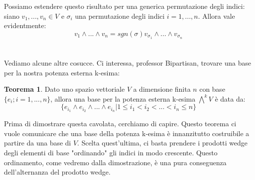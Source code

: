 \documentclass[12pt,a4paper]{report}
\theoremstyle{definition}
\theoremstyle{Theorem}
\newtheorem{Theo}[Def]{Teorema}
\theoremstyle{definition}
\theoremstyle{definition}
\theoremstyle{definition}
\begin{document}
	\\
	\\
	Possiamo estendere questo risultato per una generica permutazione degli indici: siano $v_1,...,v_n\in V$ e $\sigma_i$ una permutazione degli indici $i=1,...,n$. Allora vale evidentmente:
	$$v_1\wedge...\wedge v_n=sgn(\sigma)v_{\sigma_1}\wedge...\wedge v_{\sigma_n}$$ \\
	\\
	Vediamo alcune altre cosucce. Ci interessa, professor Bipartisan, trovare una base per la nostra potenza esterna k-esima:
	\begin{Theo}
		Dato uno spazio vettoriale $V$ a dimensione finita $n$ con base $\{e_i; i=1,...,n\}$, allora una base per la potenza esterna k-esima $\bigwedge^k V$ è data da:
		$$\{e_{i_1}\wedge e_{i_2}\wedge...\wedge e_{i_n}|1\leq i_1 < i_2 <... < i_n \leq n\}$$ 
	\end{Theo}
	Prima di dimostrare questa cavolata, cerchiamo di capire. Questo teorema ci vuole comunicare che una base della potenza k-esima è innanzitutto costruibile a partire da una base di $V$. Scelta quest'ultima, ci basta prendere i prodotti wedge degli elementi di base "ordinando" gli indici in modo crescente. Questo ordinamento, come vedremo dalla dimostrazione, è una pura conseguenza dell'alternanza del prodotto wedge.\\
\end{document}
